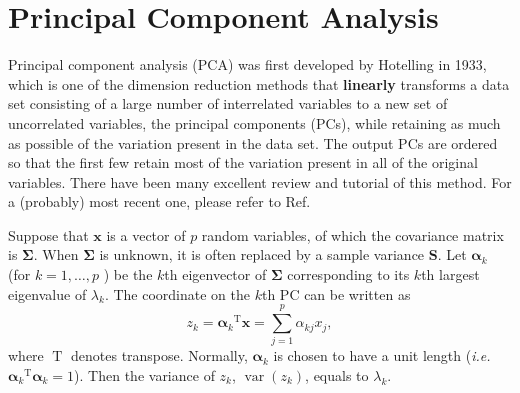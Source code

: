 \section{Principal Component Analysis\label{Sec:DR:PCA}}
Principal component analysis (PCA) was first developed by Hotelling in 1933,\cite{HotellingJEP1933} which is one of the dimension reduction methods that \textbf{linearly} transforms a data set consisting of a large number of interrelated variables to a new set of uncorrelated variables, the principal components (PCs), while retaining as much as possible of the variation present in the data set. The output PCs are ordered so that the first few retain most of the variation present in all of the original variables. There have been many excellent review and tutorial of this method. For a (probably) most recent one, please refer to Ref.~\cite{GreenacreNRMP2022}


Suppose that $\mathbf{x}$ is a vector of $p$ random variables, of which the covariance matrix is $\boldsymbol{\Sigma}$. When $\boldsymbol{\Sigma}$ is unknown, it is often replaced by a sample variance $\mathbf{S}$. Let $\boldsymbol{\alpha}_k$ (for $k=1,\dots, p$ ) be the $k$th eigenvector of $\boldsymbol{\Sigma}$ corresponding to its $k$th largest eigenvalue of $\lambda_k$. The coordinate on the $k$th PC can be written as
\begin{equation}
	z_k={\boldsymbol{\alpha}_k}^{\operatorname{T}} \mathbf{x}=\sum_{j=1}^p \alpha_{kj}x_j,
\end{equation}
where $\operatorname{T}$ denotes transpose. Normally, $\boldsymbol{\alpha}_k$ is chosen to have a unit length (\textit{i.e.} ${\boldsymbol{\alpha}_k}^{\operatorname{T}}\boldsymbol{\alpha}_k=1$). Then the variance of $z_k$, $\operatorname{var}(z_k)$, equals to $\lambda_k$.

